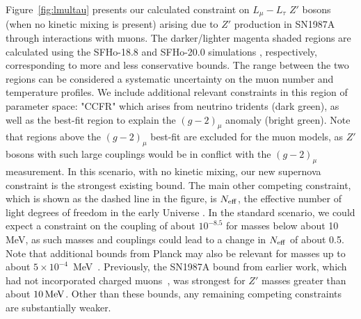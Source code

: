 \documentclass[11pt]{article}
\begin{document}
Figure~\ref{fig:lmultau} presents our calculated constraint on $L_\mu-L_\tau$ $Z'$ bosons (when no kinetic mixing is present) arising due to $Z'$ production in SN1987A through interactions with muons. The darker/lighter magenta shaded regions are calculated using the SFHo-18.8 and SFHo-20.0 simulations \cite{Bollig:2020xdr}, respectively, corresponding to more and less conservative bounds. The range between the two regions can be considered a systematic uncertainty on the muon number and temperature profiles. We include additional relevant constraints in this region of parameter space: "CCFR" which arises from neutrino tridents (dark green), as well as the best-fit region to explain the $(g-2)_\mu$ anomaly (bright green). Note that regions above the $(g-2)_\mu$ best-fit are excluded for the muon models, as $Z'$ bosons with such large couplings would be in conflict with the $(g-2)_\mu$ measurement. In this scenario, with no kinetic mixing, our new supernova constraint is the strongest existing bound. The main other competing constraint, which is shown as the dashed line in the figure, is $N_{\rm eff}$, the effective number of light degrees of freedom in the early Universe \cite{Escudero:2019gzq}. In the standard scenario, we could expect a constraint on the coupling of about $10^{-8.5}$ for masses below about 10 MeV, as such masses and couplings could lead to a change in $N_{\rm eff}$ of about 0.5. Note that additional bounds from Planck may also be relevant for masses up to about $5\times10^{-4}$~MeV~\cite{Escudero:2019gvw}. Previously, the SN1987A bound from earlier work, which had not incorporated charged muons~\cite{Escudero:2019gzq}, was strongest for $Z'$ masses greater than about $10\operatorname{MeV}$. Other than these bounds, any remaining competing constraints are substantially weaker.
\end{document}
